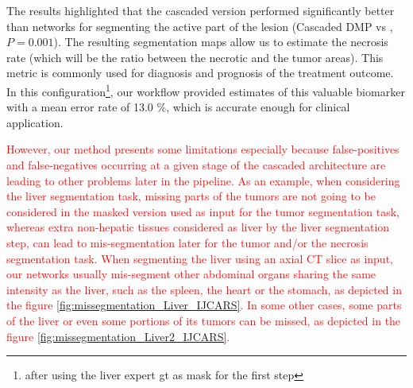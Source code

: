 The results highlighted that the cascaded version performed significantly better than  networks for segmenting the active part of the lesion (Cascaded DMP vs , $P = 0.001$).
The resulting segmentation maps allow us to estimate the necrosis rate (which will be the ratio between the necrotic and the tumor areas). This metric is commonly used for diagnosis and prognosis of the treatment outcome. In this configuration\footnote{after using the liver expert \ac{gt} as mask for the first step}, our workflow provided estimates of this valuable biomarker with a mean error rate of 13.0 \%, which is accurate enough for clinical application. \\

\textcolor{red}
{
However, our method presents some limitations especially because false-positives and false-negatives occurring at a given stage of the cascaded architecture are leading to other problems later in the pipeline. As an example, when considering the liver segmentation task, missing parts of the tumors are not going to be considered in the masked version used as input for the tumor segmentation task, whereas extra non-hepatic tissues considered as liver by the liver segmentation step, can lead to mis-segmentation later for the tumor and/or the necrosis segmentation task.
When segmenting the liver using an axial CT slice as input, our networks usually mis-segment other abdominal organs sharing the same intensity as the liver, such as the spleen, the heart or the stomach, as depicted in the figure \ref{fig:missegmentation_Liver_IJCARS}.  In some other cases, some parts of the liver or even some portions of its tumors can be missed, as depicted in the figure \ref{fig:missegmentation_Liver2_IJCARS}. 
\begin{figure}[!ht]
	\begin{mdframed}[backgroundcolor=blue!50,linecolor=blue!50]
	\centering
	\begin{minipage}{4cm}

\end{minipage}
\end{mdframed}
\end{figure}}

